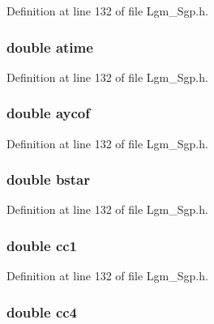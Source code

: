 Definition at line 132 of file Lgm\_\-Sgp.h.\hypertarget{struct___sgp_info_ec7bcb1d46812f966d89f66dc1a399ea}{
\subsubsection[{atime}]{\setlength{\rightskip}{0pt plus 5cm}double {\bf atime}}}
\label{struct___sgp_info_ec7bcb1d46812f966d89f66dc1a399ea}




Definition at line 132 of file Lgm\_\-Sgp.h.\hypertarget{struct___sgp_info_73cf6efaf6896931cb677e94a7d95b4a}{
\subsubsection[{aycof}]{\setlength{\rightskip}{0pt plus 5cm}double {\bf aycof}}}
\label{struct___sgp_info_73cf6efaf6896931cb677e94a7d95b4a}




Definition at line 132 of file Lgm\_\-Sgp.h.\hypertarget{struct___sgp_info_e385ed1815b61e4a30b2ab3165514f71}{
\subsubsection[{bstar}]{\setlength{\rightskip}{0pt plus 5cm}double {\bf bstar}}}
\label{struct___sgp_info_e385ed1815b61e4a30b2ab3165514f71}




Definition at line 132 of file Lgm\_\-Sgp.h.\hypertarget{struct___sgp_info_d32764e5a4a660af7424fb205e2eca4c}{
\subsubsection[{cc1}]{\setlength{\rightskip}{0pt plus 5cm}double {\bf cc1}}}
\label{struct___sgp_info_d32764e5a4a660af7424fb205e2eca4c}




Definition at line 132 of file Lgm\_\-Sgp.h.\hypertarget{struct___sgp_info_aefb3346680163a2f54c8115c6542e94}{
\subsubsection[{cc4}]{\setlength{\rightskip}{0pt plus 5cm}double {\bf cc4}}}
\label{struct___sgp_info_aefb3346680163a2f54c8115c6542e94}




